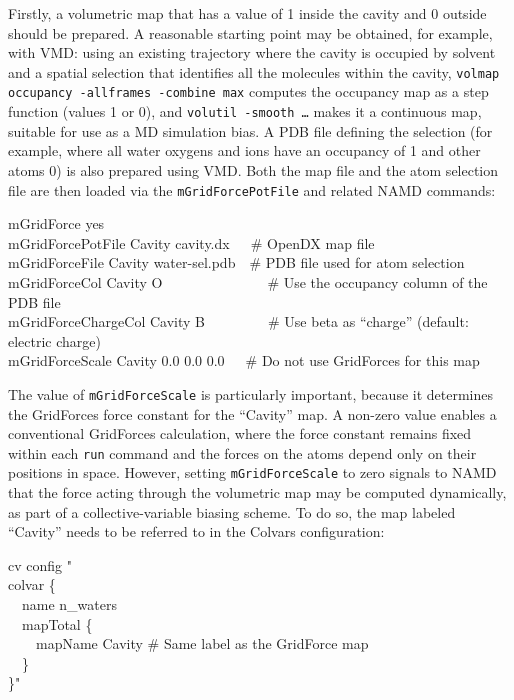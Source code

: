 {Firstly, a volumetric map that has a value of 1 inside the cavity and 0 outside should be prepared.
A reasonable starting point may be obtained, for example, with VMD: using an existing trajectory where the cavity is occupied by solvent and a spatial selection that identifies all the molecules within the cavity, \texttt{volmap occupancy -allframes -combine max} computes the occupancy map as a step function (values 1 or 0), and \texttt{volutil -smooth \ldots} makes it a continuous map, suitable for use as a MD simulation bias.
A PDB file defining the selection (for example, where all water oxygens and ions have an occupancy of 1 and other atoms 0) is also prepared using VMD.
Both the map file and the atom selection file are then loaded via the \texttt{mGridForcePotFile} and related NAMD commands:

\begin{mdexampleinput}
  \-mGridForce yes\\
  \-mGridForcePotFile Cavity cavity.dx~~~\# OpenDX map file\\
  \-mGridForceFile Cavity water-sel.pdb~~\# PDB file used for atom selection\\
  \-mGridForceCol Cavity O~~~~~~~~~~~~~~~\# Use the occupancy column of the PDB file\\
  \-mGridForceChargeCol Cavity B~~~~~~~~~\# Use beta as ``charge'' (default: electric charge)\\
  \-mGridForceScale Cavity 0.0 0.0 0.0~~~\# Do not use GridForces for this map\\
\end{mdexampleinput}

The value of \texttt{mGridForceScale} is particularly important, because it determines the GridForces force constant for the ``Cavity'' map.
A non-zero value enables a conventional GridForces calculation, where the force constant remains fixed within each \texttt{run} command and the forces on the atoms depend only on their positions in space.
However, setting \texttt{mGridForceScale} to zero signals to NAMD that the force acting through the volumetric map may be computed dynamically, as part of a collective-variable biasing scheme.
To do so, the map labeled ``Cavity'' needs to be referred to in the Colvars configuration:\\

\begin{mdexampleinput}
  \-cv config "\\
  \-colvar \{\\
  \-\-~~name n\_waters\\
  \-\-~~mapTotal \{\\
  \-\-~~~~mapName Cavity  \# Same label as the GridForce map\\
  \-\-~~\}\\
  \-\}"
\end{mdexampleinput}


}
